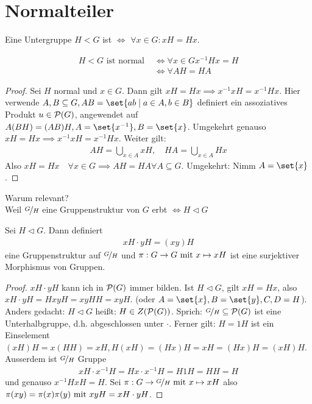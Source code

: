 \section{Normalteiler}
\begin{definition}
	Eine Untergruppe $H < G$ ist  $\Leftrightarrow$ $\forall x \in G\colon xH = Hx$.
\end{definition}
\begin{proposition}
	\begin{align*}
		H < G \text{ ist normal } &\Leftrightarrow \forall x \in G x^{-1}Hx = H\\
		&\Leftrightarrow \forall AH = HA
	\end{align*}
\end{proposition}
\begin{proof}
	Sei $H$ normal und $x \in G$. Dann gilt $xH = Hx \implies x^{-1}xH = x^{-1}Hx$. Hier verwende $A,B \subseteq G, AB = \set{ab \mid a \in A, b \in B}$ definiert ein assoziatives Produkt $u \in \powerset(G)$, angewendet auf $A(BH) = (AB)H, A = \set{x^{-1}}, B=\set{x}$. Umgekehrt genauso $xH = Hx \implies x^{-1}xH = x^{-1}Hx$. Weiter gilt:
	\begin{align*}
		AH = \bigcup_{x \in A} x H, \quad HA = \bigcup_{x \in A} Hx
	\end{align*}
	Also $xH = Hx\quad \forall x \in G \implies AH=HA \forall A \subseteq G$. Umgekehrt: Nimm $A = \set{x}$.
\end{proof}
Warum relevant?\\
Weil $\lnkset{G}{H}$ eine Gruppenstruktur von $G$ erbt $\Leftrightarrow H \lhd G$
\begin{proposition}
	\label{1_4_3_prop}
	Sei $H \lhd G$. Dann definiert
	\begin{align*}
		xH \cdot yH = (xy)H
	\end{align*}
	eine Gruppenstruktur auf $\lnkset{G}{H}$ und $\pi: G \to G \mit x \mapsto xH$ ist eine surjektiver Morphismus von Gruppen.
\end{proposition}
\begin{proof}
	$xH \cdot yH$ kann ich in $\powerset(G)$ immer bilden. Ist $H \lhd G$, gilt $xH = Hx$, also $xH\cdot yH = HxyH = xyHH = xyH$. (oder $A=\set{x}, B = \set{y}, C,D=H$). Anders gedacht: $H \lhd G$ heißt: $H \in Z(\powerset(G))$. Sprich: $\lnkset{G}{H} \subseteq \powerset(G)$ ist eine Unterhalbgruppe, d.h. abgeschlossen unter $\cdot$. Ferner gilt: $H = 1H$ ist ein Einselement $(xH)H = x(HH) = xH, H(xH) = (Hx)H = xH=(Hx)H=(xH)H$. Ausserdem ist $\lnkset{G}{H}$ Gruppe 
	\begin{align*}
		xH \cdot x^{-1}H = Hx\cdot x^{-1}H = H1H = HH = H
	\end{align*}
	und genauso $x^{-1}HxH = H$. Sei $\pi: G \to \lnkset{G}{H} \mit x \mapsto xH$ also $\pi(xy) = \pi(x)\pi(y) \mit xyH = xH \cdot yH$.
\end{proof}
